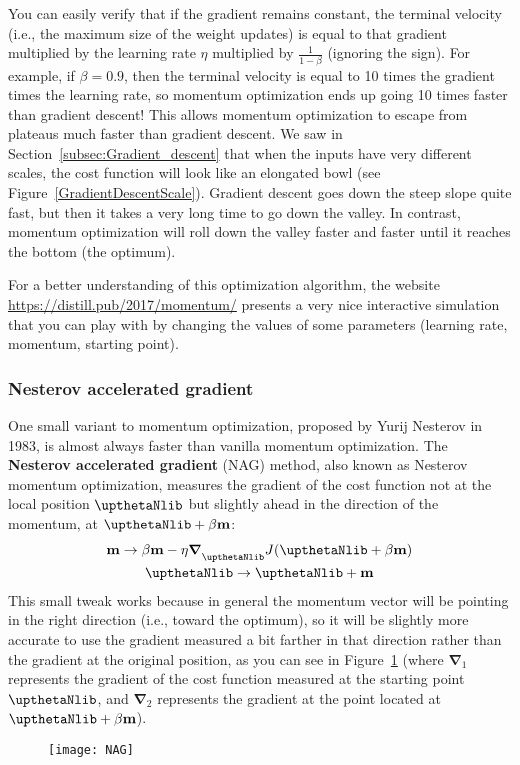 You can easily verify that if the gradient remains constant, the terminal velocity (i.e., the maximum size of the weight updates) is equal to that gradient multiplied by the learning rate $\eta$ multiplied by $\frac{1}{1-\beta}$ (ignoring the sign). For example, if $\beta=0.9$, then the terminal velocity is equal to 10 times the gradient times the learning rate, so momentum optimization ends up going 10 times faster than gradient descent! This allows momentum optimization to escape from plateaus much faster than gradient descent. We saw in Section~\ref{subsec:Gradient_descent} that when the inputs have very different scales, the cost function will look like an elongated bowl (see Figure~\ref{GradientDescentScale}). Gradient descent goes down the steep slope quite fast, but then it takes a very long time to go down the valley. In contrast, momentum optimization will roll down the valley faster and faster until it reaches the bottom (the optimum).

For a better understanding of this optimization algorithm, the website \url{https://distill.pub/2017/momentum/} presents a very nice interactive simulation that you can play with by changing the values of some parameters (learning rate, momentum, starting point).
\subsubsection{Nesterov accelerated gradient}
One small variant to momentum optimization, proposed by Yurij Nesterov in 1983, is almost always faster than vanilla momentum optimization. The \textbf{Nesterov accelerated gradient} (NAG) method, also known as Nesterov momentum optimization, measures the gradient of the cost function not at the local position $\boldtheta$ but slightly ahead in the direction of the momentum, at $\boldtheta+\beta\mathbf{m}$:
\begin{gather}
\mathbf{m}\rightarrow\beta\mathbf{m}-\eta\boldsymbol{\nabla}_{\boldtheta}J(\boldtheta+\beta\mathbf{m})\\
\boldtheta\rightarrow\boldtheta+\mathbf{m}
\end{gather}
This small tweak works because in general the momentum vector will be pointing in the right direction (i.e., toward the optimum), so it will be slightly more accurate to use the gradient measured a bit farther in that direction rather than the gradient at the original position, as you can see in Figure~\ref{NAG} (where $\boldsymbol{\nabla}_1$ represents the gradient of the cost function measured at the starting point $\boldtheta$, and $\boldsymbol{\nabla}_2$ represents the gradient at the point located at $\boldtheta+\beta\mathbf{m}$).
\begin{figure}[h!t]
\centering
\texttt{[image: NAG]}
\caption{}\label{NAG}
\end{figure}
